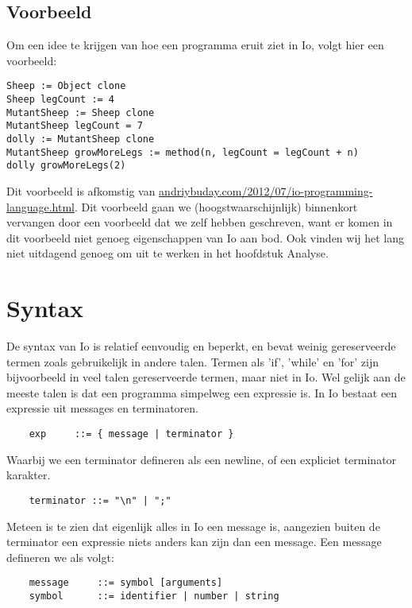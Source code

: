 \documentclass[12pt]{article}
\begin{document}
\subsection*{Voorbeeld}
Om een idee te krijgen van hoe een programma eruit ziet in Io, volgt hier een voorbeeld:
\begin{verbatim}
Sheep := Object clone
Sheep legCount := 4
MutantSheep := Sheep clone
MutantSheep legCount = 7
dolly := MutantSheep clone
MutantSheep growMoreLegs := method(n, legCount = legCount + n)
dolly growMoreLegs(2)
\end{verbatim}
Dit voorbeeld is afkomstig van \url{andriybuday.com/2012/07/io-programming-language.html}.
Dit voorbeeld gaan we (hoogstwaarschijnlijk) binnenkort vervangen door een voorbeeld dat we zelf hebben geschreven, want er komen in dit voorbeeld niet genoeg
eigenschappen van Io aan bod. Ook vinden wij het lang niet uitdagend genoeg om uit te werken in het hoofdstuk Analyse.

\section{Syntax}

De syntax van Io is relatief eenvoudig en beperkt, en bevat weinig gereserveerde termen zoals gebruikelijk in andere talen. Termen als 'if', 'while' en 'for' zijn bijvoorbeeld in veel talen gereserveerde termen, maar niet in Io. Wel gelijk aan de meeste talen is dat een programma simpelweg een expressie is. In Io bestaat een expressie uit messages en terminatoren.

\begin{lstlisting}
	exp		::= { message | terminator }
\end{lstlisting}
Waarbij we een terminator defineren als een newline, of een expliciet terminator karakter.
\begin{lstlisting}
	terminator ::= "\n" | ";"
\end{lstlisting}
Meteen is te zien dat eigenlijk alles in Io een message is, aangezien buiten de terminator een expressie niets anders kan zijn dan een message. Een message defineren we als volgt:
\begin{lstlisting}
	message		::= symbol [arguments]
	symbol		::= identifier | number | string
\end{lstlisting}
\end{document}
